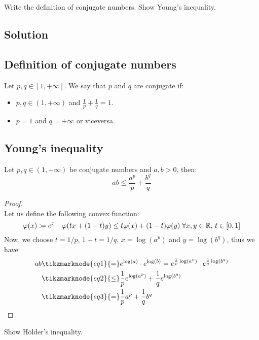 
\question
Write the definition of conjugate numbers. Show Young's inequality.

\subsection*{Solution}

\subsection{Definition of conjugate numbers}
Let $p,q\in[1,+\infty]$. We say that $p$ and $q$ are conjugate if:
\begin{itemize}
    \item $p,q \in (1,+\infty)$ and $\frac{1}{p}+\frac{1}{q}=1$.
    \item $p=1$ and $q=+\infty$ or viceversa.
\end{itemize}

\subsection{Young's inequality}
Let $p,q \in (1,+\infty)$ be conjugate numbers and $a,b > 0$, then:
\[ ab \leq \frac{a^p}{p} + \frac{b^q}{q} \]

\begin{proof}
    \hspace*{\fill}\\ %
    Let us define the following convex function:
    \[ \varphi(x) \coloneqq e^x \quad \varphi(tx + (1-t)y) \leq t\varphi(x) + (1-t)\varphi(y) \; \forall x,y \in \mathbb{R}, \, t \in [0,1] \]
    Now, we choose $t=1/p$, $1-t=1/q$, $x=\log(a^p)$ and $y=\log(b^q)$, thus we have:
    \begin{align*}
        ab & \tikzmarknode{eq1}{=} e^{\log(a)} \cdot e^{\log(b)} =  e^{\frac{1}{p}\log(a^p)} \cdot e^{\frac{1}{q}\log(b^q)} \\
        & \tikzmarknode{eq2}{\leq}  \frac{1}{p}e^{\log(a^p)} + \frac{1}{q}e^{\log(b^q)} \\
        & \tikzmarknode{eq3}{=} \frac{1}{p} a^p + \frac{1}{q} b^q
    \end{align*}

\end{proof}


\question
Show Hölder's inequality.

